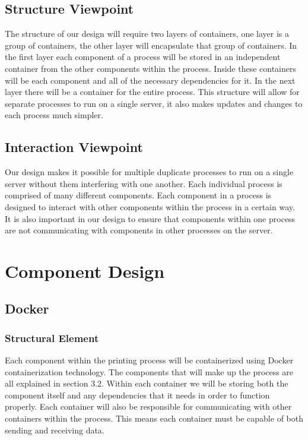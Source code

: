\documentclass[onecolumn, draftclsnofoot,10pt, compsoc]{IEEEtran}
\begin{document}
\subsection{Structure Viewpoint}
The structure of our design will require two layers of containers, one layer is a group of containers, the other layer will encapsulate that group of containers. In the first layer each component of a process will be stored in an independent container from the other components within the process. Inside these containers will be each component and all of the necessary dependencies for it. In the next layer there will be a container for the entire process. This structure will allow for separate processes to run on a single server, it also makes updates and changes to each process much simpler.
\subsection{Interaction Viewpoint}
Our design makes it possible for multiple duplicate processes to run on a single server without them interfering with one another. Each individual process is comprised of many different components. Each component in a process is designed to interact with other components within the process in a certain way. It is also important in our design to ensure that components within one process are not communicating with components in other processes on the server. 


\section{Component Design}

\subsection{Docker}
\subsubsection{Structural Element}
Each component within the printing process will be containerized using Docker containerization technology. The components that will make up the process are all explained in section 3.2. Within each container we will be storing both the component itself and any dependencies that it needs in order to function properly. Each container will also be responsible for communicating with other containers within the process. This means each container must be capable of both sending and receiving data. 
\end{document}
